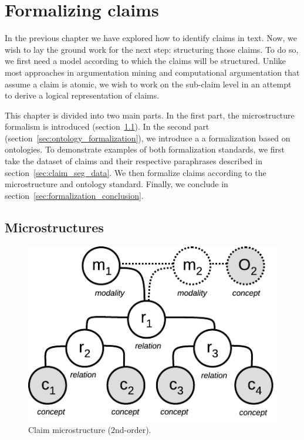 \chapter{Formalizing claims}
\label{chap:formalization}

In the previous chapter we have explored how to identify claims in text.
Now, we wish to lay the ground work for the next step: structuring those claims. 
To do so, we first need a model according to which the claims will be structured. 
Unlike most approaches in argumentation mining and computational argumentation that
assume a claim is atomic, we wish to work on the sub-claim level in an attempt to 
derive a logical representation of claims. 

This chapter is divided into two main parts.  In the first part, the
microstructure formalism is introduced (section~\ref{sec:for_microstructures}).
In the second part (section~\ref{sec:ontology_formalization}), we introduce a a
formalization based on ontologies. To demonstrate examples of both formalization
standards, we first take the dataset of claims and their respective paraphrases
described in section~\ref{sec:claim_seg_data}. We then formalize claims 
according to the microstructure and ontology standard.
Finally, we conclude in section~\ref{sec:formalization_conclusion}.

\section{Microstructures}
\label{sec:for_microstructures}

\begin{figure}
	\begin{center}
      \includegraphics[scale=1]{microstructure.pdf}
      \end{center}
      \caption{Claim microstructure (2nd-order).}
  \label{fig:structures_flowchart}
\end{figure}

